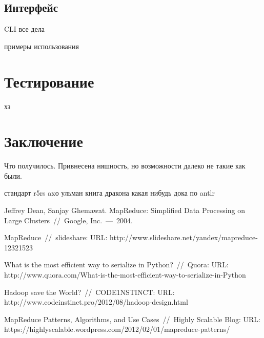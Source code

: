 \documentclass[12pt,a4paper,oneside]{extarticle}
\begin{document}
    \subsection{Интерфейс}
        CLI все дела

        примеры использования

        

\clearpage

\section{Тестирование}
хз    
\clearpage

\section{Заключение}
    Что получилось. Привнесена няшность, но возможности далеко не такие как были.
\clearpage


\begin{thebibliography}{0}
     стандарт r5rs
     axо ульман книга дракона
     какая нибудь дока по antlr

        Jeffrey Dean, Sanjay Ghemawat. MapReduce: Simplified Data Processing on Large Clusters~//~Google, Inc.~---~2004.

        MapReduce~//~slideshare: URL: \newline
        http://www.slideshare.net/yandex/mapreduce-12321523

        What is the most efficient way to serialize in Python?~//~Quora: URL:  \newline
        http://www.quora.com/What-is-the-most-efficient-way-to-serialize-in-Python

        Hadoop save the World?~//~CODE1NSTINCT: URL:  \newline
        http://www.codeinstinct.pro/2012/08/hadoop-design.html

        MapReduce Patterns, Algorithms, and Use Cases~//~Highly Scalable Blog: URL:  \newline
        https://highlyscalable.wordpress.com/2012/02/01/mapreduce-patterns/
        
\end{thebibliography}
\end{document}
